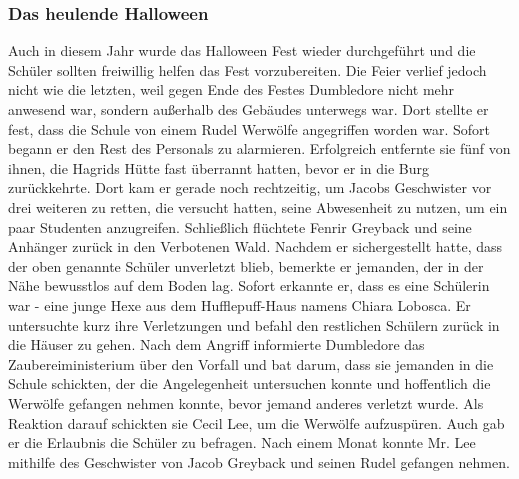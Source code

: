 \documentclass[a4paper, 10pt]{article}
\begin{document}
\subsubsection*{Das heulende Halloween}
Auch in diesem Jahr wurde das Halloween Fest wieder durchgeführt und die Schüler sollten freiwillig helfen das Fest vorzubereiten. Die Feier verlief jedoch nicht wie die letzten, weil gegen Ende des Festes Dumbledore nicht mehr anwesend war, sondern außerhalb des Gebäudes unterwegs war.
\vspace{10pt}
\newline
{}  
Dort stellte er fest, dass die Schule von einem Rudel Werwölfe angegriffen worden war. Sofort begann er den Rest des Personals zu alarmieren. Erfolgreich entfernte sie fünf von ihnen, die Hagrids Hütte fast überrannt hatten, bevor er in die Burg zurückkehrte. Dort kam er gerade noch rechtzeitig, um Jacobs Geschwister vor drei weiteren zu retten, die versucht hatten, seine Abwesenheit zu nutzen, um ein paar Studenten anzugreifen. Schließlich flüchtete Fenrir Greyback und seine Anhänger zurück in den Verbotenen Wald. Nachdem er sichergestellt hatte, dass der oben genannte Schüler unverletzt blieb, bemerkte er jemanden, der in der Nähe bewusstlos auf dem Boden lag. Sofort erkannte er, dass es eine Schülerin war - eine junge Hexe aus dem Hufflepuff-Haus namens Chiara Lobosca. Er untersuchte kurz ihre Verletzungen und befahl den restlichen Schülern zurück in die Häuser zu gehen. Nach dem Angriff informierte Dumbledore das Zaubereiministerium über den Vorfall und bat darum, dass sie jemanden in die Schule schickten, der die Angelegenheit untersuchen konnte und hoffentlich die Werwölfe gefangen nehmen konnte, bevor jemand anderes verletzt wurde. Als Reaktion darauf schickten sie Cecil Lee, um die Werwölfe aufzuspüren. Auch gab er die Erlaubnis die Schüler zu befragen. Nach einem Monat konnte Mr. Lee mithilfe des Geschwister von Jacob Greyback und seinen Rudel gefangen nehmen.
\end{document}
